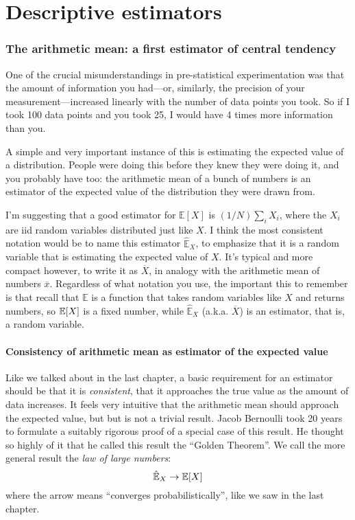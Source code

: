 
\chapter{Descriptive estimators}

\subsection{The arithmetic mean: a first estimator of central tendency}

One of the crucial misunderstandings in pre-statistical experimentation was
that the amount of information you had---or, similarly, the precision of your
measurement---increased linearly with the number of data points you took. So
if I took 100 data points and you took 25, I would have 4 times more
information than you.

A simple and very important instance of this is estimating the expected value
of a distribution. People were doing this before they knew they were doing it,
and you probably have too: the arithmetic mean of a bunch of numbers is an
estimator of the expected value of the distribution they were drawn from.

I'm suggesting that a good estimator for $\mathbb{E}[X]$ is $(1/N)\sum_i X_i$,
where the $X_i$ are iid random variables distributed just like $X$. I think
the most consistent notation would be to name this estimator
$\hat{\mathbb{E}}_X$, to emphasize that it is a random variable that is
estimating the expected value of $X$. It's typical and more compact however,
to write it as $\overline{X}$, in analogy with the arithmetic mean of numbers
$\overline{x}$. Regardless of what notation you use, the important this to
remember is that recall that $\mathbb{E}$ is a function that takes random
variables like $X$ and returns numbers, so $\mathbb{E}\!\left[{X}\right]$ is a fixed number,
while $\hat{\mathbb{E}}_X$ (a.k.a. $\overline{X}$) is an estimator, that is, a
random variable.

\subsubsection{Consistency of arithmetic mean as estimator of the expected value}

Like we talked about in the last chapter, a basic requirement for an estimator
should be that it is \emph{consistent}, that it approaches the true value as
the amount of data increases. It feels very intuitive that the arithmetic mean
should approach the expected value, but but is not a trivial result. Jacob
Bernoulli took 20 years to formulate a suitably rigorous proof of a special
case of this result. He thought so highly of it that he called this result the
``Golden Theorem''. We call the more general result the \emph{law of large
numbers}:
\begin{equation}
\hat{\mathbb{E}}_X \to \mathbb{E}\!\left[{X}\right]
\end{equation}
where the arrow means ``converges probabilistically'', like we saw in the last
chapter.

